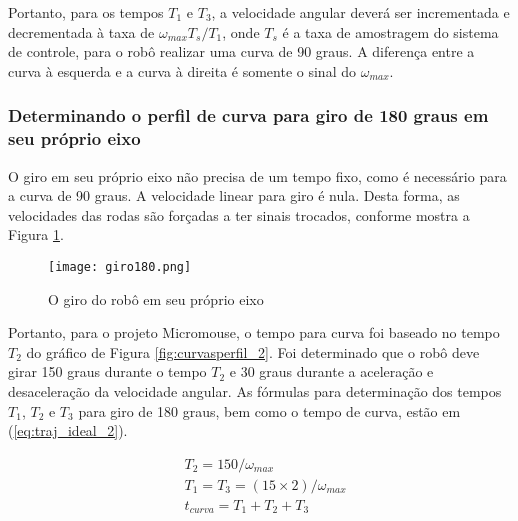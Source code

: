	Portanto, para os tempos $T_1$ e $T_3$, a velocidade angular deverá ser incrementada e decrementada à taxa de $\omega_{max}T_s/T_1$, onde $T_s$ é a taxa de amostragem do sistema de controle, para o robô realizar uma curva de 90 graus. A diferença entre a curva à esquerda e a curva à direita é somente o sinal do $\omega_{max}$.
	
\subsubsection{Determinando o perfil de curva para giro de 180 graus em seu próprio eixo}

O giro em seu próprio eixo não precisa de um tempo fixo, como é necessário para a curva de 90 graus. A velocidade linear para giro é nula. Desta forma, as velocidades das rodas são forçadas a ter sinais trocados, conforme mostra a Figura \ref{fig:curvasperfil_3}. 

\begin{figure}[!htb]
	\caption{\label{fig:curvasperfil_3}O giro do robô em seu próprio eixo}
	\begin{center}
		\texttt{[image: giro180.png]}
	\end{center}
\end{figure} 

Portanto, para o projeto Micromouse, o tempo para curva foi baseado no tempo $T_2$ do gráfico de Figura \ref{fig:curvasperfil_2}. Foi determinado que o robô deve girar 150 graus durante o tempo $T_2$ e 30 graus durante a aceleração e desaceleração da velocidade angular. As fórmulas para determinação dos tempos $T_1$, $T_2$ e $T_3$ para giro de 180 graus, bem como o tempo de curva, estão em (\ref{eq:traj_ideal_2}).

\begin{equation}
\label{eq:traj_ideal_2}
	\begin{split}
	&T_2 = 150/\omega_{max}\\
	&T_1 = T_3 = (15 \times 2)/\omega_{max}\\
	&t_{curva} = T_1 + T_2 + T_3\\
	\end{split}
\end{equation}


